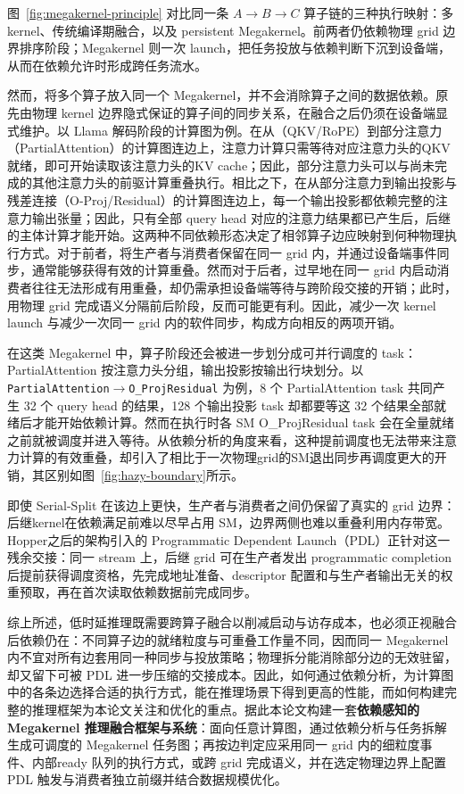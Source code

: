 图~\ref{fig:megakernel-principle} 对比同一条 $A\!\rightarrow\!B\!\rightarrow\!C$ 算子链的三种执行映射：多 kernel、传统编译期融合，以及 persistent Megakernel。前两者仍依赖物理 grid 边界排序阶段；Megakernel 则一次 launch，把任务投放与依赖判断下沉到设备端，从而在依赖允许时形成跨任务流水。



然而，将多个算子放入同一个 Megakernel，并不会消除算子之间的数据依赖。原先由物理 kernel 边界隐式保证的算子间的同步关系，在融合之后仍须在设备端显式维护。以 Llama 解码阶段的计算图为例。在从（QKV/RoPE）到部分注意力（PartialAttention）的计算图连边上，注意力计算只需等待对应注意力头的QKV就绪，即可开始读取该注意力头的KV cache；因此，部分注意力头可以与尚未完成的其他注意力头的前驱计算重叠执行。相比之下，在从部分注意力到输出投影与残差连接（O-Proj/Residual）的计算图连边上，每一个输出投影都依赖完整的注意力输出张量；因此，只有全部 query head 对应的注意力结果都已产生后，后继的主体计算才能开始。这两种不同依赖形态决定了相邻算子边应映射到何种物理执行方式。对于前者，将生产者与消费者保留在同一 grid 内，并通过设备端事件同步，通常能够获得有效的计算重叠。然而对于后者，过早地在同一 grid 内启动消费者往往无法形成有用重叠，却仍需承担设备端等待与跨阶段交接的开销；此时，用物理 grid 完成语义分隔前后阶段，反而可能更有利。因此，减少一次 kernel launch 与减少一次同一 grid 内的软件同步，构成方向相反的两项开销。

在这类 Megakernel 中，算子阶段还会被进一步划分成可并行调度的 task：PartialAttention 按注意力头分组，输出投影按输出行块划分。以 \texttt{PartialAttention}$\rightarrow$\texttt{O\_ProjResidual} 为例，8 个 PartialAttention task 共同产生 32 个 query head 的结果，128 个输出投影 task 却都要等这 32 个结果全部就绪后才能开始依赖计算。然而在执行时各 SM {O\_ProjResidual} task 会在全量就绪之前就被调度并进入等待。从依赖分析的角度来看，这种提前调度也无法带来注意力计算的有效重叠，却引入了相比于一次物理grid的SM退出同步再调度更大的开销，其区别如图~\ref{fig:hazy-boundary}所示。




即使 Serial-Split 在该边上更快，生产者与消费者之间仍保留了真实的 grid 边界：后继kernel在依赖满足前难以尽早占用 SM，边界两侧也难以重叠利用内存带宽。Hopper之后的架构引入的 Programmatic Dependent Launch（PDL）正针对这一残余交接：同一 stream 上，后继 grid 可在生产者发出 programmatic completion 后提前获得调度资格，先完成地址准备、descriptor 配置和与生产者输出无关的权重预取，再在首次读取依赖数据前完成同步\cite{nvidia2026pdl,nvidia2026cutlassDependentLaunch}。

综上所述，低时延推理既需要跨算子融合以削减启动与访存成本，也必须正视融合后依赖仍在：不同算子边的就绪粒度与可重叠工作量不同，因而同一 Megakernel 内不宜对所有边套用同一种同步与投放策略；物理拆分能消除部分边的无效驻留，却又留下可被 PDL 进一步压缩的交接成本。因此，如何通过依赖分析，为计算图中的各条边选择合适的执行方式，能在推理场景下得到更高的性能，而如何构建完整的推理框架为本论文关注和优化的重点。据此本论文构建一套\textbf{依赖感知的 Megakernel 推理融合框架与系统}：面向任意计算图，通过依赖分析与任务拆解生成可调度的 Megakernel 任务图；再按边判定应采用同一 grid 内的细粒度事件、内部ready 队列的执行方式，或跨 grid 完成语义，并在选定物理边界上配置 PDL 触发与消费者独立前缀并结合数据规模优化。
